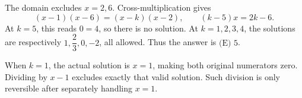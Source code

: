 The domain excludes $x=2,6$. Cross-multiplication gives
\[
(x-1)(x-6)=(x-k)(x-2),\qquad(k-5)x=2k-6.
\]
At $k=5$, this reads $0=4$, so there is no solution. At $k=1,2,3,4$, the solutions are respectively $1,\dfrac{2}{3},0,-2$, all allowed. Thus the answer is $\boxed{\text{(E) }5}$.

When $k=1$, the actual solution is $x=1$, making both original numerators zero. Dividing by $x-1$ excludes exactly that valid solution. Such division is only reversible after separately handling $x=1$.

